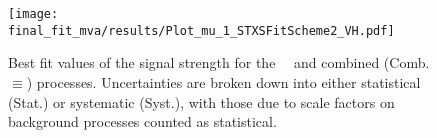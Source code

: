 \begin{figure}[hb]
	\centering
	\texttt{[image: final\_fit\_mva/results/Plot\_mu\_1\_STXSFitScheme2\_VH.pdf]}
  \caption[Best fit values for \WH\, \ZH\ and \VH\ signal strength.]{Best fit
    values of the signal strength for the \WH\, \ZH\ and combined
    (Comb.$\equiv$\VH) processes. Uncertainties are broken down into either
    statistical (Stat.) or systematic (Syst.), with those due to scale factors
    on background processes counted as statistical.}
  \label{fig:WZH-mus}
\end{figure}